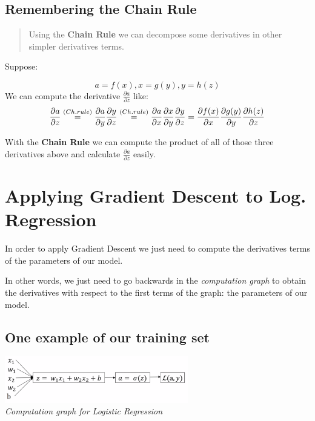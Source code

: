 \documentclass[
]{book}
\begin{document}
\hypertarget{remembering-the-chain-rule}{%
\subsection{Remembering the Chain Rule}\label{remembering-the-chain-rule}}

\begin{quote}
Using the \textbf{Chain Rule} we can decompose some derivatives in other simpler derivatives terms.
\end{quote}

Suppose:

\[
a = f(x), x = g(y), y = h(z)
\]
We can compute the derivative \(\frac{\partial a}{\partial z}\) like:
\[
\frac{\partial a}{\partial z} \stackrel{(Ch.rule)}{=} \\ 
\frac{\partial a}{\partial y} \frac{\partial y}{\partial z} \stackrel{(Ch.rule)}{=} \frac{\partial a}{\partial x} \frac{\partial x}{\partial y} \frac{\partial y}{\partial z} = \\ 
\frac{\partial f(x)}{\partial x} \frac{\partial g(y)}{\partial y} \frac{\partial h(z)}{\partial z}
\]

With the \textbf{Chain Rule} we can compute the product of all of those three derivatives above and calculate \(\frac{\partial a}{\partial z}\) easily.

\hypertarget{applying-gradient-descent-to-log.-regression}{%
\section{Applying Gradient Descent to Log. Regression}\label{applying-gradient-descent-to-log.-regression}}

In order to apply Gradient Descent we just need to compute the derivatives terms of the parameters of our model.

In other words, we just need to go backwards in the \emph{computation graph} to obtain the derivatives with respect to the first terms of the graph: the parameters of our model.

\hypertarget{one-example}{%
\subsection{One example of our training set}\label{one-example}}

\includegraphics[width=0.6\textwidth,height=\textheight]{images/graph_log_reg.png}\\
\emph{Computation graph for Logistic Regression}
\end{document}
